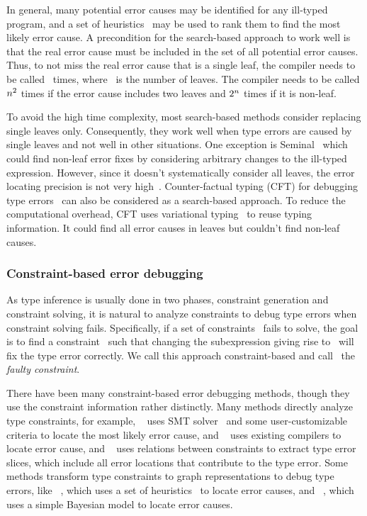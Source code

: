 \documentclass[12pt]{report}	%
\begin{document}
In general, many potential error causes may be identified for
any ill-typed program, and a set of
heuristics~\cite{Hage07:HTE,Lerner07:STM} may be used to
rank them to find the most likely error cause.
A precondition for the search-based approach to
work well is that the real error cause must be
included in the set of all potential error causes.
Thus, to not miss the real error cause that is a single leaf,
the compiler needs to be called \nlevs\ times, where \nlevs\
is the number of leaves. The compiler needs to be called
$n^2$ times if the error cause includes two leaves and
$2^{n}$ times if it is non-leaf.

To avoid the high time complexity,
most search-based methods consider replacing single leaves
only. Consequently, they work well when type errors
are caused by single leaves and not well in other situations.
One exception is Seminal~\cite{Lerner06:SSM,Lerner07:STM} which
could find non-leaf error fixes by considering arbitrary
changes to the ill-typed expression. However, since it doesn't
systematically consider all leaves, the error locating
precision is not very high~\cite{CE14popl,Zhang14:tgd}.
%
Counter-factual
typing (CFT) for debugging type errors~\cite{CE14popl,CE14flops}
can also be considered as a search-based approach. To reduce the
computational overhead, CFT uses
variational typing~\cite{CEW12icfp,CEW14toplas} to reuse
typing information. It could find all error causes in leaves
but couldn't find non-leaf causes.

\subsubsection{Constraint-based error debugging}
\label{sec:background:leaves:constraint}

As type inference is usually done in two phases, constraint
generation and constraint solving, it is natural to
analyze constraints to debug type errors when constraint
solving fails.
%
Specifically, if a set
of constraints \cs\ fails to solve, the goal is to find
a constraint \con\ such that changing
the subexpression giving rise to \con\ will fix the type
error correctly. We call this approach constraint-based
and call \con\ the \emph{faulty constraint}.
%

There have been many constraint-based error debugging methods,
though they use the constraint information rather distinctly.
Many methods directly analyze type constraints,
for example, \toolMin~\cite{Pavlinovic14:FMT,Pavlinovic15:PST}
uses SMT solver~\cite{Nieuwenhuis06:SSS} and some
user-customizable criteria to locate the most likely error cause,
and \toolM~\cite{Loncaric16:PFT} uses existing
compilers to locate error cause, and \toolSk~\cite{Haack03:TES}
uses relations between constraints to extract type
error slices, which include all error locations that
contribute to the type error. Some methods transform type
constraints to graph representations to debug type errors,
like \toolH~\cite{Heeren03:HLH,Heeren05:TQT},
which uses a set of heuristics~\cite{Hage07:HTE} to locate
error causes, and
\toolS~\cite{Zhang14:tgd,Zhang15:DTE}, which uses a simple
Bayesian model to locate error causes.
\end{document}

